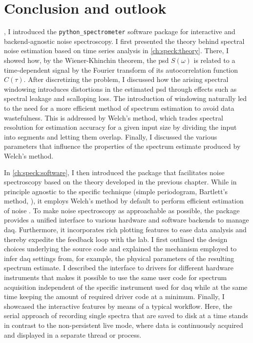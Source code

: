 \chapter{Conclusion and outlook}\label{ch:speck:conclusion}
 \thispart, I introduced the \texttt{python_spectrometer} software package for interactive and backend\hyp{}agnostic noise spectroscopy.
I first presented the theory behind spectral noise estimation based on time series analysis in \cref{ch:speck:theory}.
There, I showed how, by the Wiener-Khinchin theorem, the \gls{psd} $S(\omega)$ is related to a time-dependent signal by the Fourier transform of its autocorrelation function $C(\tau)$.
After discretizing the problem, I discussed how the arising spectral windowing introduces distortions in the estimated \gls{psd} through effects such as spectral leakage and scalloping loss.
The introduction of windowing naturally led to the need for a more efficient method of spectrum estimation to avoid data wastefulness.
This is addressed by Welch's method, which trades spectral resolution for estimation accuracy for a given input size by dividing the input into segments and letting them overlap.
Finally, I discussed the various parameters that influence the properties of the spectrum estimate produced by Welch's method.

In \cref{ch:speck:software}, I then introduced the \pyspeck package that facilitates noise spectroscopy based on the theory developed in the previous chapter.
While in principle agnostic to the specific technique (simple periodogram, Bartlett's method, \etc), it employs Welch's method by default to perform efficient estimation of noise .
To make noise spectroscopy as approachable as possible, the package provides a unified interface to various hardware and software backends to manage \acrlong{daq}.
Furthermore, it incorporates rich plotting features to ease data analysis and thereby expedite the feedback loop with the lab.
I first outlined the design choices underlying the source code and explained the mechanism employed to infer \gls{daq} settings from, for example, the physical parameters of the resulting spectrum estimate.
I described the interface to drivers for different hardware instruments that makes it possible to use the same user code for spectrum acquisition independent of the specific instrument used for \acrlong{daq} while at the same time keeping the amount of required driver code at a minimum.
Finally, I showcased the interactive features by means of a typical workflow.
Here, the serial approach of recording single spectra that are saved to disk at a time stands in contrast to the non-persistent live mode, where data is continuously acquired and displayed in a separate thread or process.

